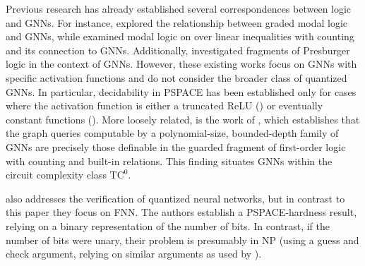 Previous research has already established several correspondences between logic and GNNs. For instance, \citet{DBLP:conf/iclr/BarceloKM0RS20} explored the relationship between graded modal logic and GNNs, while \citet{ijcai2024} examined modal logic on over linear inequalities with counting and its connection to GNNs. Additionally, \citet{benedikt2024decidability} investigated fragments of Presburger logic in the context of GNNs. However, these existing works focus on GNNs with specific activation functions and do not consider the broader class of quantized GNNs. In particular, decidability in PSPACE has been established only for cases where the activation function is either a truncated ReLU (\cite{ijcai2024}) or eventually constant functions (\cite{benedikt2024decidability}). 
More loosely related, is the work of \citet{Grohe23}, which establishes that the graph queries computable by a polynomial-size, bounded-depth family of GNNs are precisely those definable in the guarded fragment    of first-order logic with counting and built-in relations. This finding situates GNNs within the circuit complexity class  $\text{TC}^0$.


\citet{HenzingerLZ21} also addresses the verification of quantized neural networks, but in contrast to this paper they focus on FNN. The authors establish a PSPACE-hardness result, relying on a binary representation of the number of bits. In contrast, if the number of bits were unary, their problem is presumably in NP (using a guess and check argument, relying on similar arguments as used by \cite{SalzerL21}).

